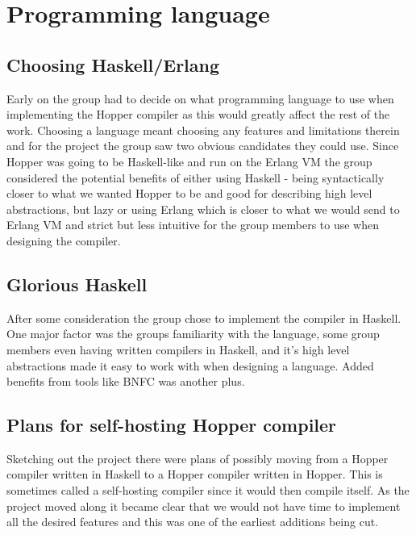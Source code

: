 \section{Programming language}


\subsection{Choosing Haskell/Erlang}

Early on the group had to decide on what programming language to use when implementing the Hopper compiler as this would greatly affect the rest of the work. Choosing a language meant choosing any features and limitations therein and for the project the group saw two obvious candidates they could use. Since Hopper was going to be Haskell-like and run on the Erlang VM the group considered the potential benefits of either using Haskell - being syntactically closer to what we wanted Hopper to be and good for describing high level abstractions, but lazy or using Erlang which is closer to what we would send to Erlang VM and strict but less intuitive for the group members to use when designing the compiler.


\subsection{Glorious Haskell}

After some consideration the group chose to implement the compiler in Haskell. One major factor was the groups familiarity with the language, some group members even having written compilers in Haskell, and it's high level abstractions made it easy to work with when designing a language. Added benefits from tools like BNFC was another plus.

\subsection{Plans for self-hosting Hopper compiler}

Sketching out the project there were plans of possibly moving from a Hopper compiler written in Haskell to a Hopper compiler written in Hopper. This is sometimes called a self-hosting compiler since it would then compile itself. As the project moved along it became clear that we would not have time to implement all the desired features and this was one of the earliest additions being cut.
